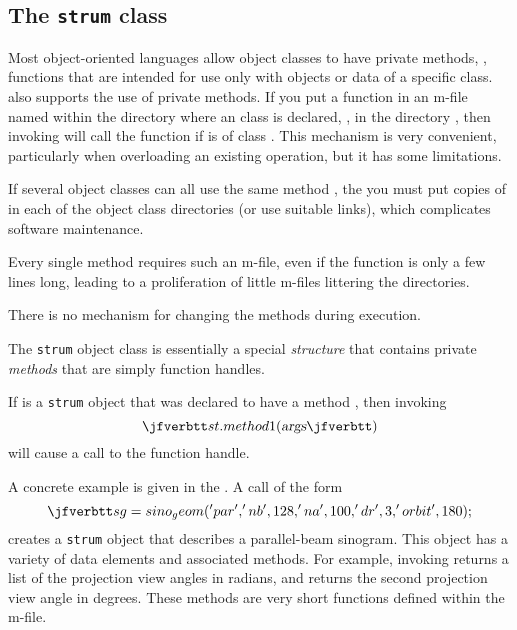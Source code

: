 \newcommand{\strum} {\texttt{strum}\xspace}

\subsection{The \strum class}

Most object-oriented languages
allow object classes
to have private methods,
\ie,
functions that are intended for use
only with objects or data
of a specific class.
\matlab also supports
the use of private methods.
If you put a function
in an m-file named
within the directory
where an class  is declared,
\ie, in the directory 
,
then invoking
will call the function 
if  is of class .
This mechanism is very convenient,
particularly when overloading
an existing \matlab operation,
but it has some limitations.
\blist
\item
If several object classes
can all use the same method ,
the you must put copies of 
in each of the object class directories
(or use suitable links),
which complicates software maintenance.

\item
Every single method
requires such an m-file,
even if the function
is only a few lines long,
leading to a proliferation
of little m-files
littering the directories.

\item
There is no mechanism
for changing the methods
during execution.

\elist

The \strum object class
is essentially a special \emph{structure}
that contains private \emph{methods}
that are simply function handles.

If  is a \strum object
that was declared to have
a method ,
then invoking
\[
\ty{st.method1(}\textsl{args}\ty{)}
\]
will cause a call
to the function handle.

A concrete example
is given in the .
A call of the form
\[
\ty{sg = sino_geom('par', 'nb', 128, 'na', 100, 'dr', 3, 'orbit', 180);}
\]
creates a \strum object
that describes a parallel-beam sinogram.
This object
has a variety of data elements
and associated methods.
For example,
invoking
returns a list of the projection view angles
in radians,
and
returns the second projection view angle in degrees.
These methods are very short functions
defined within the  m-file.
